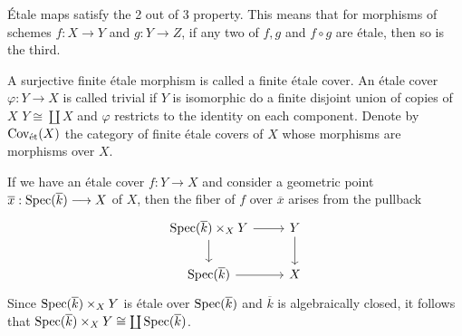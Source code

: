 \begin{remark}
	\'Etale maps satisfy the 2 out of 3 property. This means that for morphisms of schemes $f \colon X \to Y$ and $g \colon Y \to Z$, if any two of $f, g$ and $f \circ g$ are \'etale, then so is the third.
\end{remark}

\begin{definition}
	A surjective finite \'etale morphism is called a finite \'etale cover. An \'etale cover $\varphi : Y \to X$ is called trivial if $Y$ is isomorphic do a finite disjoint union of copies of $X$ $Y \cong \coprod X$ and $\varphi$ restricts to the identity on each component. Denote by $\text{Cov}_{\text{\'et}}(X)$ the category of finite \'etale covers of $X$ whose morphisms are morphisms over $X$.
\end{definition}

\begin{remark}
	If we have an \'etale cover $f: Y \to X$ and consider a geometric point $\overline{x} : \operatorname{Spec}(\overline{k}) \longrightarrow X$ of $X$, then the fiber of $f$ over $\overline{x}$ arises from the pullback
	\[\begin{tikzcd}
			{\Spec(\overline{k})\times_X Y} & Y \\
			{\Spec(\overline{k})} & X
			\arrow[from=1-1, to=2-1]
			\arrow[from=1-1, to=1-2]
			\arrow[from=1-2, to=2-2]
			\arrow[from=2-1, to=2-2]
		\end{tikzcd}\]
	Since $\operatorname{Spec}(\overline{k})\times_X Y$ is \'etale over $\operatorname{Spec}(\overline{k})$ and $\overline{k}$ is algebraically closed, it follows that $\operatorname{Spec}(\overline{k})\times_X Y \cong \coprod \operatorname{Spec}(\overline{k})$.
\end{remark}

%

